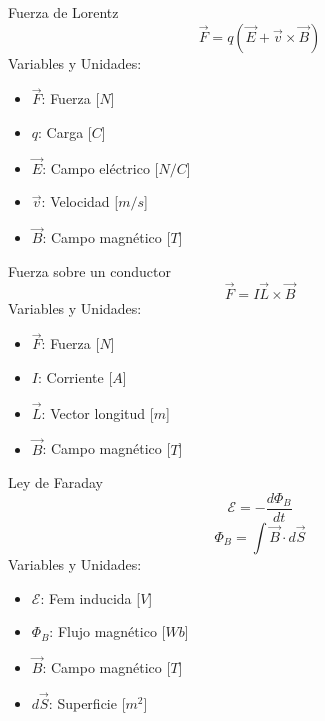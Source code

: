 \begin{landscape}
\begin{multicols}{3}
\begin{teorema}{Fuerza de Lorentz}
    $$\vec{F} = q(\vec{E} + \vec{v} \times \vec{B})$$
    Variables y Unidades:
    \begin{itemize}
        \item $\vec{F}$: Fuerza [$N$]
        \item $q$: Carga [$C$]
        \item $\vec{E}$: Campo eléctrico [$N/C$]
        \item $\vec{v}$: Velocidad [$m/s$]
        \item $\vec{B}$: Campo magnético [$T$]
    \end{itemize}

    \begin{center}
    \end{center}
\end{teorema}

\begin{teorema}{Fuerza sobre un conductor}
    $$\vec{F} = I \vec{L} \times \vec{B}$$
    Variables y Unidades:
    \begin{itemize}
        \item $\vec{F}$: Fuerza [$N$]
        \item $I$: Corriente [$A$]
        \item $\vec{L}$: Vector longitud [$m$]
        \item $\vec{B}$: Campo magnético [$T$]
    \end{itemize}
\end{teorema}

\columnbreak

\begin{teorema}{Ley de Faraday}
    $$\mathcal{E} = -\frac{d\Phi_B}{dt}$$
    $$\Phi_B = \int \vec{B} \cdot d\vec{S}$$
    Variables y Unidades:
    \begin{itemize}
        \item $\mathcal{E}$: Fem inducida [$V$]
        \item $\Phi_B$: Flujo magnético [$Wb$]
        \item $\vec{B}$: Campo magnético [$T$]
        \item $d\vec{S}$: Superficie [$m^2$]
    \end{itemize}
\end{teorema}


\end{multicols}
\end{landscape}
